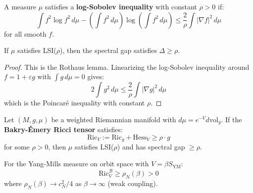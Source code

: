\begin{definition}
\label{def:log-sobolev}
A measure $\mu$ satisfies a \textbf{log-Sobolev inequality} with constant $\rho > 0$ if:
\[
\int f^2 \log f^2 \, d\mu - \left( \int f^2 \, d\mu \right) \log \left( \int f^2 \, d\mu \right) 
\leq \frac{2}{\rho} \int |\nabla f|^2 \, d\mu
\]
for all smooth $f$.
\end{definition}

\begin{theorem}
\label{thm:log-sobolev-gap}
If $\mu$ satisfies LSI($\rho$), then the spectral gap satisfies $\Delta \geq \rho$.
\end{theorem}

\begin{proof}
This is the Rothaus lemma. Linearizing the log-Sobolev inequality around 
$f = 1 + \varepsilon g$ with $\int g \, d\mu = 0$ gives:
\[
2 \int g^2 \, d\mu \leq \frac{2}{\rho} \int |\nabla g|^2 \, d\mu
\]
which is the Poincaré inequality with constant $\rho$.
\end{proof}

\begin{theorem}
\label{thm:bakry-emery}
Let $(M, g, \mu)$ be a weighted Riemannian manifold with $d\mu = e^{-V} d\text{vol}_g$. 
If the \textbf{Bakry-Émery Ricci tensor} satisfies:
\[
\text{Ric}_V := \text{Ric}_g + \text{Hess}_V \geq \rho \cdot g
\]
for some $\rho > 0$, then $\mu$ satisfies LSI($\rho$) and has spectral gap $\geq \rho$.
\end{theorem}

\begin{theorem}
\label{thm:bakry-emery-ym}
For the Yang-Mills measure on orbit space with $V = \beta S_{\text{YM}}$:
\[
\text{Ric}_V^{\mathcal{B}} \geq \rho_N(\beta) > 0
\]
where $\rho_N(\beta) \to c_N^2/4$ as $\beta \to \infty$ (weak coupling).
\end{theorem}

